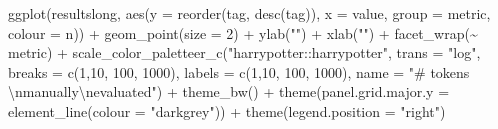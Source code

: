 \documentclass[
  letterpaper,
  DIV=11,
  numbers=noendperiod]{scrreprt}
\newenvironment{Shaded}{\begin{snugshade}}{\end{snugshade}}
\newcommand{\AttributeTok}[1]{\textcolor[rgb]{0.40,0.45,0.13}{#1}}
\newcommand{\DecValTok}[1]{\textcolor[rgb]{0.68,0.00,0.00}{#1}}
\newcommand{\FunctionTok}[1]{\textcolor[rgb]{0.28,0.35,0.67}{#1}}
\newcommand{\NormalTok}[1]{\textcolor[rgb]{0.00,0.23,0.31}{#1}}
\newcommand{\SpecialCharTok}[1]{\textcolor[rgb]{0.37,0.37,0.37}{#1}}
\newcommand{\StringTok}[1]{\textcolor[rgb]{0.13,0.47,0.30}{#1}}
\begin{document}
\begin{Shaded}
\begin{Highlighting}[]
\FunctionTok{ggplot}\NormalTok{(resultslong, }\FunctionTok{aes}\NormalTok{(}\AttributeTok{y =} \FunctionTok{reorder}\NormalTok{(tag, }\FunctionTok{desc}\NormalTok{(tag)), }\AttributeTok{x =}\NormalTok{ value, }\AttributeTok{group =}\NormalTok{ metric, }\AttributeTok{colour =}\NormalTok{ n)) }\SpecialCharTok{+}
  \FunctionTok{geom\_point}\NormalTok{(}\AttributeTok{size =} \DecValTok{2}\NormalTok{) }\SpecialCharTok{+}
  \FunctionTok{ylab}\NormalTok{(}\StringTok{""}\NormalTok{) }\SpecialCharTok{+}
  \FunctionTok{xlab}\NormalTok{(}\StringTok{""}\NormalTok{) }\SpecialCharTok{+}
  \FunctionTok{facet\_wrap}\NormalTok{(}\SpecialCharTok{\textasciitilde{}}\NormalTok{ metric) }\SpecialCharTok{+}
  \FunctionTok{scale\_color\_paletteer\_c}\NormalTok{(}\StringTok{"harrypotter::harrypotter"}\NormalTok{, }\AttributeTok{trans =} \StringTok{"log"}\NormalTok{, }\AttributeTok{breaks =} \FunctionTok{c}\NormalTok{(}\DecValTok{1}\NormalTok{,}\DecValTok{10}\NormalTok{, }\DecValTok{100}\NormalTok{, }\DecValTok{1000}\NormalTok{), }\AttributeTok{labels =} \FunctionTok{c}\NormalTok{(}\DecValTok{1}\NormalTok{,}\DecValTok{10}\NormalTok{, }\DecValTok{100}\NormalTok{, }\DecValTok{1000}\NormalTok{), }\AttributeTok{name =} \StringTok{"\# tokens }\SpecialCharTok{\textbackslash{}n}\StringTok{manually}\SpecialCharTok{\textbackslash{}n}\StringTok{evaluated"}\NormalTok{) }\SpecialCharTok{+}
  \FunctionTok{theme\_bw}\NormalTok{() }\SpecialCharTok{+}
  \FunctionTok{theme}\NormalTok{(}\AttributeTok{panel.grid.major.y =} \FunctionTok{element\_line}\NormalTok{(}\AttributeTok{colour =} \StringTok{"darkgrey"}\NormalTok{)) }\SpecialCharTok{+}
  \FunctionTok{theme}\NormalTok{(}\AttributeTok{legend.position =} \StringTok{"right"}\NormalTok{)}
\end{Highlighting}
\end{Shaded}
\end{document}

